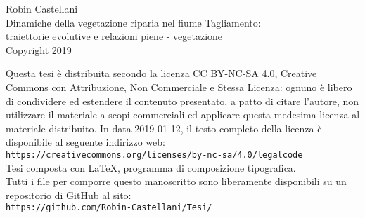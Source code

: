 \vspace*{0.35\textwidth}
%
\begin{center}
	Robin Castellani
	\\
	Dinamiche della vegetazione riparia nel fiume Tagliamento:
	\\
	traiettorie evolutive e relazioni piene - vegetazione
	\\
	Copyright \textcopyright{} 2019
\end{center}
%
\vfill
%
Questa tesi è distribuita secondo la licenza CC BY-NC-SA 4.0, Creative Commons con Attribuzione, Non Commerciale e Stessa Licenza: ognuno è libero di condividere ed estendere il contenuto presentato, a patto di citare l'autore, non utilizzare il materiale a scopi commerciali ed applicare questa medesima licenza al materiale distribuito.
In data 2019-01-12, il testo completo della licenza è disponibile al seguente indirizzo web:
\\
\texttt{https://creativecommons.org/licenses/by-nc-sa/4.0/legalcode}
\\
Tesi composta con \LaTeX{}, programma di composizione tipografica.
\\
Tutti i file per comporre questo manoscritto sono liberamente disponibili su un repositorio di GitHub al sito:
\\
\texttt{https://github.com/Robin-Castellani/Tesi/}
